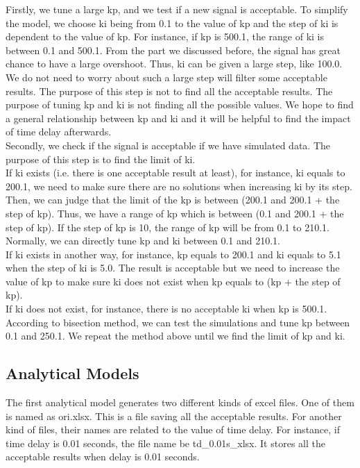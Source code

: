 Firstly, we tune a large kp, and we test if a new signal is acceptable. To simplify the model, we choose ki being from 0.1 to the value of kp and the step of ki is dependent to the value of kp. For instance, if kp is 500.1, the range of ki is between 0.1 and 500.1. From the part we discussed before, the signal has great chance to have a large overshoot. Thus, ki can be given a large step, like 100.0. We do not need to worry about such a large step will filter some acceptable results. The purpose of this step is not to find all the acceptable results. The purpose of tuning kp and ki is not finding all the possible values. We hope to find a general relationship between kp and ki and it will be helpful to find the impact of time delay afterwards.\\ 

Secondly, we check if the signal is acceptable if we have simulated data. The purpose of this step is to find the limit of ki. \\

If ki exists (i.e. there is one acceptable result at least), for instance, ki equals to 200.1, we need to make sure there are no solutions when increasing ki by its step. Then, we can judge that the limit of the kp is between (200.1 and 200.1 + the step of kp). Thus, we have a range of kp which is between (0.1 and 200.1 + the step of kp). If the step of kp is 10, the range of kp will be from 0.1 to 210.1. Normally, we can directly tune kp and ki between 0.1 and 210.1. \\

If ki exists in another way, for instance, kp equals to 200.1 and ki equals to 5.1 when the step of ki is 5.0. The result is acceptable but we need to increase the value of kp to make sure ki does not exist when kp equals to (kp + the step of kp). \\

If ki does not exist, for instance, there is no acceptable ki when kp is 500.1. According to bisection method, we can test the simulations and tune kp between 0.1 and 250.1. We repeat the method above until we find the limit of kp and ki. \\


\subsection{Analytical Models} %
\label{subsection3.4.2}

The first analytical model generates two different kinds of excel files. One of them is named as ori.xlsx. This is a file saving all the acceptable results. For another kind of files, their names are related to the value of time delay. For instance, if time delay is 0.01 seconds, the file name be td\_0.01s\_xlsx. It stores all the acceptable results when delay is 0.01 seconds. \\


